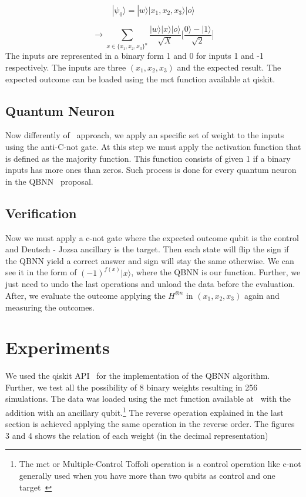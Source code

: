 \documentclass[conference]{IEEEtran}
\begin{document}
  \begin{equation}
          |\psi_0\rangle = |w\rangle|x_1, x_2, x_3\rangle|o\rangle
  \end{equation}

  \begin{equation}
          \rightarrow \sum_{x \in \{x_1, x_2, x_3\}^n}
          \frac{|w\rangle|x\rangle|o\rangle}{\sqrt{X}}\Bigg[\frac{0\rangle - |1\rangle}{\sqrt{2}}\Bigg]
  \end{equation}
  The inputs are represented in a binary form 1 and 0 for inputs 1 and -1 respectively.
  The inputs are three  $(x_1, x_2, x_3)$ and the expected result.
  The expected outcome can be loaded using the mct function available at qiskit.

\subsection{Quantum Neuron}\label{subsec:quantum-neuron}
  Now differently of~\cite{fawaz2019training} approach, we apply an specific set of weight to the inputs using the
  anti-C-not gate.
  At this step we must apply the activation function that is defined as the majority function.
 This function consists of given 1 if a binary inputs has more ones than zeros.
  Such process is done for every quantum neuron in the QBNN~\cite{fawaz2019training} proposal.

\subsection{Verification}\label{subsec:verification}
  Now we must apply a c-not gate where the expected outcome qubit is the control and Deutsch - Jozsa ancillary is the target.
 Then each state will flip the sign if the QBNN yield a correct answer and sign will stay the same otherwise.
 We can see it in the form of \((-1)^{f(x)}|x\rangle\), where the QBNN is our function.
 Further, we just need to undo the last operations and unload the data before the evaluation.
 After, we evaluate the outcome applying the $H^{\otimes n}$ in $(x_1, x_2, x_3)$ again and measuring the outcomes.



\section{Experiments}\label{sec:experiments}

    We used the qiskit API~\cite{Qiskit} for the implementation of the QBNN algorithm.
    Further, we test all the possibility of 8 binary weights resulting in 256 simulations.
    The data was loaded using the mct function available at~\cite{Qiskit} with the addition with an ancillary qubit.\footnote{
   The mct or Multiple-Control Toffoli operation is a control operation like c-not generally used when you have more than
   two qubits as control and one target~\cite{Maslov_2016}
}
    The reverse operation explained in the last section is achieved applying the same operation in the reverse order.
    The figures 3 and 4 shows the relation of each weight (in the decimal representation)
\end{document}
